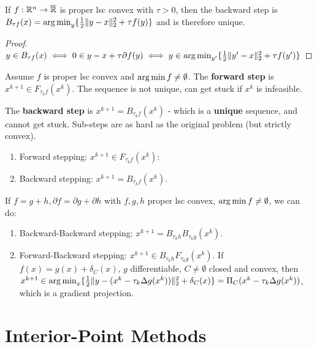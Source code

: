 \begin{thm}
  \label{sec:first-order-methods-2}
  If $f: \mathbb{R}^{n} \rightarrow \overline {\mathbb{R}}$ is proper lsc convex with
  $\tau > 0$, then the backward step is $B_{\tau f}(x) = \operatorname*{arg\,min}_{y}
  \{ \frac{1}{2} \| y - x \|_{2}^{2} + \tau f(y) \} $ and is therefore unique.
\end{thm}

\begin{proof}
  $y \in B_{\tau f}(x) \iff 0 \in y - x + \tau \partial f(y) \iff y
  \in \operatorname*{arg\,min}_{y'} \{ \frac{1}{2} \| y' - x \|_{2}^{2} + \tau f(y') \}$
\end{proof}

\begin{thm}
  \label{sec:first-order-methods-3}
  Assume $f$ is proper lsc convex and $\operatorname*{arg\,min} f \neq \emptyset$. The
  \textbf{forward step} is $x^{k+1} \in F_{\tau_{k} f}(x^{k})$. The
  sequence is not unique, can get stuck if $x^{k}$ is infeasible.

  The \textbf{backward step} is $x^{k+1} = B_{\tau_{k} f}(x^{k})$ -
  which is a \textbf{unique} sequence, and cannot get stuck.  Sub-steps
  are as hard as the original problem (but strictly convex).
\end{thm}

\begin{enumerate}
\item Forward stepping: $x^{k+1} \in F_{\tau_{k} f}(x^{k})$:
\item Backward stepping: $x^{k+1} = B_{\tau_{k} f}(x^{k})$.
\end{enumerate}

If $f = g + h, \partial f = \partial g + \partial h$ with $f, g, h$
proper lsc convex, $\operatorname*{arg\,min} f \neq \emptyset$, we can do:

\begin{enumerate}
\item Backward-Backward stepping: $x^{k+1} = B_{\tau_{k} h}
  B_{\tau_{k} g}(x^{k})$.
\item Forward-Backward stepping: $x^{k+1} \in B_{\tau_{k} h}
  F_{\tau_{k} g}(x^{k})$.  If $f(x) = g(x) + \delta_{C}(x)$, $g$
  differentiable, $C \neq \emptyset$ closed and convex, then $x^{k+1}
  \in \operatorname*{arg\,min}_{x} \{ \frac{1}{2}  \| y - (x^{k} - \tau_{k} \Delta
  g(x^{k})) \|_{2}^{2} + \delta_{C}(x) \} = \operatorname*{\Pi}_{C}(x^{k} - \tau_{k}
  \Delta g(x^{k}))$, which is a gradient projection.
\end{enumerate}

\section{Interior-Point Methods}
\label{sec:inter-point-meth}

